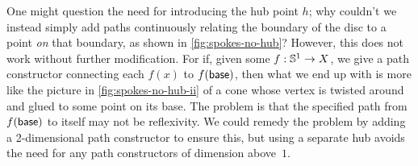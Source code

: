 \documentclass[hott-all.tex]{subfiles}
\begin{document}
% 
\begin{rmk}
One might question the need for introducing the hub point $h$; why couldn't we instead simply add paths continuously relating the boundary of the disc to a point \emph{on} that boundary, as shown in \cref{fig:spokes-no-hub}?
However, this does not work without further modification.
For if, given some $f:\mathbb{S}^1 \to X$, we give a path constructor connecting each $f(x)$ to $f(\mathsf{base})$, then what we end up with is more like the picture in \cref{fig:spokes-no-hub-ii} of a cone whose vertex is twisted around and glued to some point on its base.
The problem is that the specified path from $f(\mathsf{base})$ to itself may not be reflexivity.
We could remedy the problem by adding a 2-dimensional path constructor to ensure this, but using a separate hub avoids the need for any path constructors of dimension above~$1$.
\end{rmk}
% 
\end{document}
